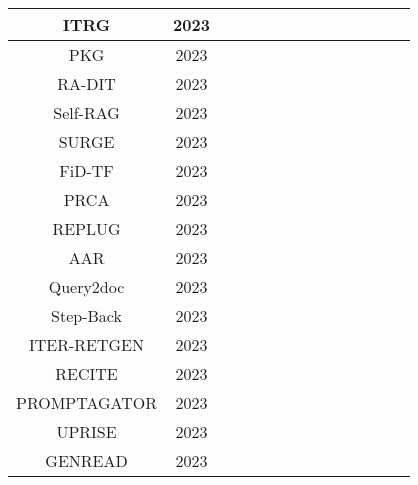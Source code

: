 \begin{table}[htb]
{\begin{tabular}{|c|c|c|c|c|c|c|c|c|c|c|c|c|c|}
			\hline
			ITRG \cite{feng2024retrievalgeneration} & 2023 & \Checkmark & \Checkmark & \Checkmark &  &  &  &  & \Checkmark &  &  & \Checkmark &  \\ 
			\hline
			PKG \cite{luo2023augmented} & 2023 & \Checkmark &  &  &  &  &  &  &  &  &  &  & \\ 
			\hline
			RA-DIT \cite{lin2024radit} & 2023 &  & \Checkmark & \Checkmark & \Checkmark &  &  & \Checkmark & \Checkmark &  &  & \Checkmark &  \\ 
			\hline
			Self-RAG \cite{asai2024selfrag} & 2023 &  & \Checkmark &  & \Checkmark &  &  &  &  &  & \Checkmark &  & \\ 
			\hline
			SURGE \cite{kang2023knowledge} & 2023 & \Checkmark &  &  &  &  &  &  & \Checkmark &  &  &  & \\ 
			\hline
			FiD-TF \cite{berchansky2023optimizing} & 2023 &  & \Checkmark &  &  &  &  &  &  & \Checkmark & \Checkmark &  &  \\ 
			\hline
			PRCA \cite{yang2023prca} & 2023 &  & \Checkmark &  & \Checkmark &  &  &  & \Checkmark &  &  & \Checkmark &  \\ 
			\hline
			REPLUG \cite{shi2023replug} & 2023 &  & \Checkmark &  & \Checkmark &  &  &  &  &  &  & \Checkmark & \\ 
			\hline
			AAR \cite{yu2023augmentationadapted} & 2023 &  & \Checkmark &  & \Checkmark &  &  &  & \Checkmark &  &  &  &  \\ 
			\hline
			Query2doc \cite{wang2023querydoc} & 2023 & \Checkmark &  &  &  &  & \Checkmark &  &  &  &  &  &  \\ 
			\hline
			Step-Back \cite{zheng2024take} & 2023 &  & \Checkmark & \Checkmark &  &  & \Checkmark &  &  &  &  &  &  \\ 
			\hline
			ITER-RETGEN \cite{shao2023enhancing} & 2023 &  & \Checkmark & \Checkmark &  &  &  &  & \Checkmark & \Checkmark &  &  &  \\ 
			\hline
			RECITE \cite{sun2023recitationaugmented} & 2023 & \Checkmark &  & \Checkmark & \Checkmark &  &  & \Checkmark &  &  &  & \Checkmark &  \\ 
			\hline
			PROMPTAGATOR \cite{dai2023promptagator} & 2023 & \Checkmark &  & \Checkmark &  &  & \Checkmark &  &  & \Checkmark & \Checkmark &  &  \\ 
			\hline
			UPRISE \cite{cheng2023uprise} & 2023 & \Checkmark &  & \Checkmark & \Checkmark &  &  & \Checkmark & \Checkmark &  &  & \Checkmark &  \\ 
			\hline
			GENREAD \cite{yu2023generate} & 2023 & \Checkmark &  &  &  &  &  & \Checkmark &  &  &  & \Checkmark &  \\ 

\end{tabular}}
\end{table}
